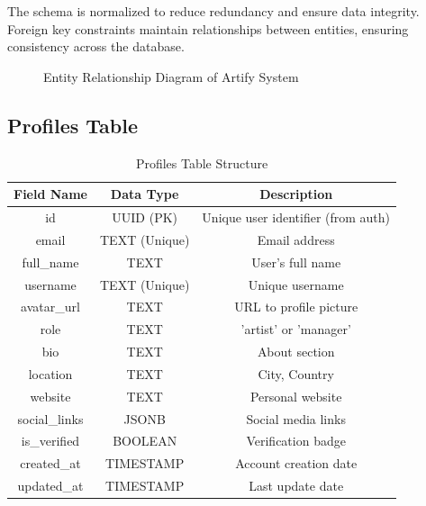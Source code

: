 \documentclass[12pt,a4paper]{report}
\begin{document}
The schema is normalized to reduce redundancy and ensure data integrity. Foreign key constraints maintain relationships between entities, ensuring consistency across the database.

\begin{figure}[H]
    \centering
    \caption{Entity Relationship Diagram of Artify System}
    \label{fig:er_diagram}
\end{figure}

\subsection*{Profiles Table}

\begin{table}[H]
\centering
\caption{Profiles Table Structure}
\begin{tabular}{|c|c|c|}
\hline
\textbf{Field Name} & \textbf{Data Type} & \textbf{Description} \\
\hline
id & UUID (PK) & Unique user identifier (from auth) \\
email & TEXT (Unique) & Email address \\
full\_name & TEXT & User's full name \\
username & TEXT (Unique) & Unique username \\
avatar\_url & TEXT & URL to profile picture \\
role & TEXT & 'artist' or 'manager' \\
bio & TEXT & About section \\
location & TEXT & City, Country \\
website & TEXT & Personal website \\
social\_links & JSONB & Social media links \\
is\_verified & BOOLEAN & Verification badge \\
created\_at & TIMESTAMP & Account creation date \\
updated\_at & TIMESTAMP & Last update date \\
\hline
\end{tabular}
\end{table}
\end{document}
